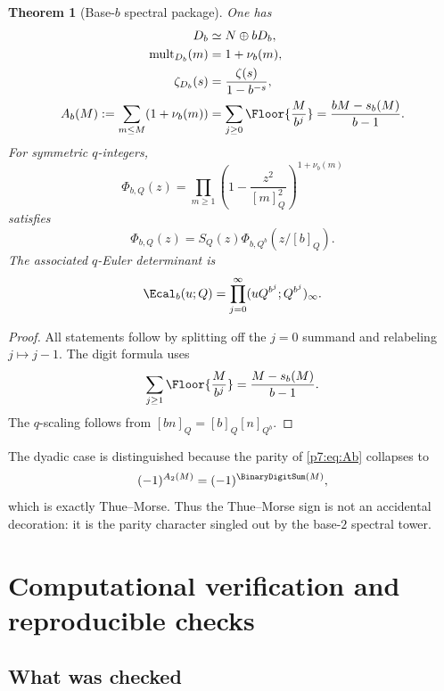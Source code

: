 \documentclass[11pt]{article}
\numberwithin{equation}{section}
\newtheorem{theorem}{Theorem}[section]
\theoremstyle{definition}
\theoremstyle{remark}
\begin{document}
\begin{theorem}[Base-$b$ spectral package]\label{p7:thm:base-b}
One has
\begin{align}
 D_b&\simeq N\oplus bD_b,\label{p7:eq:Db-scale}\\
 \operatorname{mult}_{D_b}(m)&=1+\nu_b(m),\label{p7:eq:mb}\\
 \zeta_{D_b}(s)&=\frac{\zeta(s)}{1-b^{-s}},\label{p7:eq:zetab}\\
 A_b(M):=\sum_{m\le M}(1+\nu_b(m))
 &=\sum_{j\ge0}\Floor{\frac{M}{b^j}}
 =\frac{bM-s_b(M)}{b-1}.\label{p7:eq:Ab}
\end{align}
For symmetric $q$-integers,
\begin{equation}\label{p7:eq:PhibQ}
 \Phi_{b,Q}(z)=\prod_{m\ge1}
 \left(1-\frac{z^2}{[m]_Q^2}\right)^{1+\nu_b(m)}
\end{equation}
satisfies
\begin{equation}\label{p7:eq:PhibQ-scale}
 \Phi_{b,Q}(z)=S_Q(z)
 \Phi_{b,Q^b}\!\left(z/[b]_Q\right).
\end{equation}
The associated $q$-Euler determinant is
\begin{equation}\label{p7:eq:Eb}
 \Ecal_b(u;Q)=\prod_{j=0}^{\infty}
 (uQ^{b^j};Q^{b^j})_\infty.
\end{equation}
\end{theorem}

\begin{proof}
All statements follow by splitting off the $j=0$ summand and relabeling $j\mapsto j-1$.  The digit formula uses
\[
 \sum_{j\ge1}\Floor{\frac{M}{b^j}}
 =\frac{M-s_b(M)}{b-1}.
\]
The $q$-scaling follows from $[bn]_Q=[b]_Q[n]_{Q^b}$.
\end{proof}

The dyadic case is distinguished because the parity of \cref{p7:eq:Ab} collapses to
\[
 (-1)^{A_2(M)}=(-1)^{\BinaryDigitSum(M)},
\]
which is exactly Thue--Morse.  Thus the Thue--Morse sign is not an accidental decoration: it is the parity character singled out by the base-$2$ spectral tower.

\section{Computational verification and reproducible checks}

\subsection{What was checked}
\end{document}

